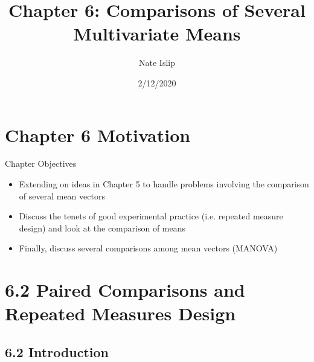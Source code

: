\documentclass[8pt]{beamer}
\title[MATH 585]{Chapter 6: Comparisons of Several Multivariate Means}
\author{Nate Islip}
\institute{Eastern Washington University}
\date{2/12/2020}
\begin{document}

\begin{frame}
  \titlepage
\end{frame}




\section{Chapter 6 Motivation}
\begin{frame}{Chapter Objectives}
\begin{itemize}
  \item Extending on ideas in Chapter 5 to handle problems involving the comparison of several mean vectors
  \item Discuss the tenets of good experimental practice (i.e. repeated measure design) and look at the comparison of means
  \item Finally, discuss several comparisons among mean vectors (MANOVA) 
\end{itemize}
\end{frame}



\section{6.2 Paired Comparisons and Repeated Measures Design}


\label{6.2}
\subsection{6.2 Introduction}
\end{document}
